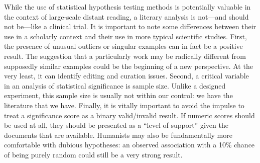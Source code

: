 While the use of statistical hypothesis testing methods is potentially valuable in the context of large-scale distant reading, a literary analysis is not---and should not be---like a clinical trial.
It is important to note some differences between their use in a scholarly context and their use in more typical scientific studies.
First, the presence of unusual outliers or singular examples can in fact be a positive result.
The suggestion that a particularly work may be radically different from supposedly similar examples could be the beginning of a new perspective.
At the very least, it can identify editing and curation issues.
Second, a critical variable in an analysis of statistical significance is sample size.
Unlike a designed experiment, this sample size is usually not within our control: we have the literature that we have.
Finally, it is vitally important to avoid the impulse to treat a significance score as a binary valid/invalid result.
If numeric scores should be used at all, they should be presented as a ``level of support'' given the documents that are available.
Humanists may also be fundamentally more comfortable with dubious hypotheses: an observed association with a 10\% chance of being purely random could still be a very strong result.

